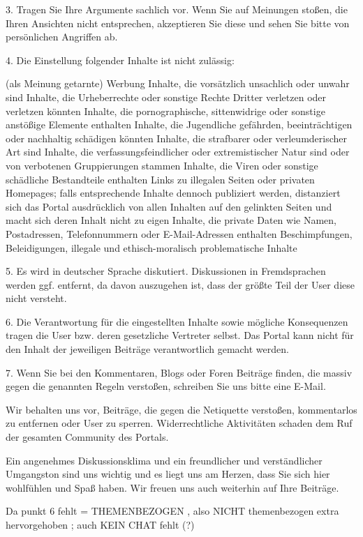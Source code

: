 3. Tragen Sie Ihre Argumente sachlich vor. Wenn Sie auf Meinungen stoßen, die Ihren Ansichten nicht entsprechen, akzeptieren Sie diese und sehen Sie bitte von persönlichen Angriffen ab.

4. Die Einstellung folgender Inhalte ist nicht zulässig:

    (als Meinung getarnte) Werbung
    Inhalte, die vorsätzlich unsachlich oder unwahr sind
    Inhalte, die Urheberrechte oder sonstige Rechte Dritter verletzen oder verletzen könnten
    Inhalte, die pornographische, sittenwidrige oder sonstige anstößige Elemente enthalten Inhalte, die Jugendliche gefährden, beeinträchtigen oder nachhaltig schädigen könnten
    Inhalte, die strafbarer oder verleumderischer Art sind
    Inhalte, die verfassungsfeindlicher oder extremistischer Natur sind oder von verbotenen Gruppierungen stammen
    Inhalte, die Viren oder sonstige schädliche Bestandteile enthalten
    Links zu illegalen Seiten oder privaten Homepages; falls entsprechende Inhalte dennoch publiziert werden, distanziert sich das Portal ausdrücklich von allen Inhalten auf den gelinkten Seiten und macht sich deren Inhalt nicht zu eigen
    Inhalte, die private Daten wie Namen, Postadressen, Telefonnummern oder E-Mail-Adressen enthalten
    Beschimpfungen, Beleidigungen, illegale und ethisch-moralisch problematische Inhalte

5. Es wird in deutscher Sprache diskutiert. Diskussionen in Fremdsprachen werden ggf. entfernt, da davon auszugehen ist, dass der größte Teil der User diese nicht versteht.

6. Die Verantwortung für die eingestellten Inhalte sowie mögliche Konsequenzen tragen die User bzw. deren gesetzliche Vertreter selbst. Das Portal kann nicht für den Inhalt der jeweiligen Beiträge verantwortlich gemacht werden.

7. Wenn Sie bei den Kommentaren, Blogs oder Foren Beiträge finden, die massiv gegen die genannten Regeln verstoßen, schreiben Sie uns bitte eine E-Mail.

Wir behalten uns vor, Beiträge, die gegen die Netiquette verstoßen, kommentarlos zu entfernen oder User zu sperren. Widerrechtliche Aktivitäten schaden dem Ruf der gesamten Community des Portals.

Ein angenehmes Diskussionsklima und ein freundlicher und verständlicher Umgangston sind uns wichtig und es liegt uns am Herzen, dass Sie sich hier wohlfühlen und Spaß haben. Wir freuen uns auch weiterhin auf Ihre Beiträge.

Da punkt 6 fehlt = THEMENBEZOGEN , also NICHT themenbezogen extra hervorgehoben ; auch KEIN CHAT fehlt (?)